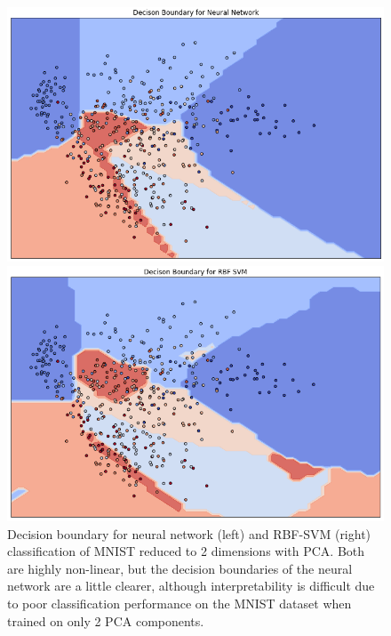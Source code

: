 \documentclass[11pt]{article}
\begin{document}
\begin{figure}[h]
    \centering
    \begin{minipage}{0.45\textwidth}
        \centering
        \includegraphics[height=0.6\linewidth]{figures/02_classification/nn_decision_boundary.png}
    \end{minipage}\hfill
    \begin{minipage}{0.45\textwidth}
        \centering
        \includegraphics[height=0.6\linewidth]{figures/02_classification/svm_decision_boundary.png}
    \end{minipage}
    \caption{Decision boundary for neural network (left) and RBF-SVM (right) classification of MNIST reduced to 2 dimensions with PCA. Both are highly non-linear, but the decision boundaries of the neural network are a little clearer, although interpretability is difficult due to poor classification performance on the MNIST dataset when trained on only 2 PCA components.}
    \label{decision_boundaries}
\end{figure}
\end{document}
